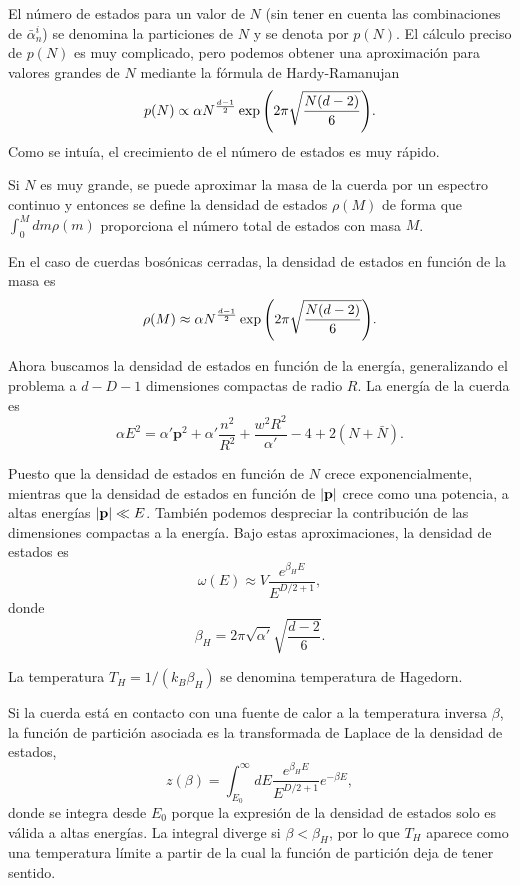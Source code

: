 El número de estados para un valor de $N$ (sin tener en cuenta las combinaciones de $\bar \alpha^i_n$) se denomina la particiones de $N$ 
y se denota por $p(N)$.
El cálculo preciso de $p(N)$ es muy complicado, pero podemos obtener una aproximación para
valores grandes de $N$ mediante la fórmula de Hardy-Ramanujan
\begin{equation}
  p(N)\propto \alpha N^ {\frac{d-1}{2}}\exp\qty(2\pi\sqrt{\frac{N(d-2)}{6}}).
\end{equation}
Como se intuía, el crecimiento de el número de estados es muy rápido.

Si $N$ es muy grande, se puede aproximar la masa de la cuerda por un espectro continuo y entonces se define la
densidad de estados $\rho(M)$ de forma que $\int_0^M dm \rho(m)$ proporciona el número total
de estados con masa $M$.

En el caso de cuerdas bosónicas cerradas, la densidad de estados en función de la masa es
\begin{equation}
  \rho(M)\approx \alpha N^ {\frac{d-1}{2}}\exp\qty(2\pi\sqrt{\frac{N(d-2)}{6}}).
\end{equation}

Ahora buscamos la densidad de estados en función de la energía, generalizando el problema a $d-D-1$ dimensiones compactas 
de radio $R$.
La energía de la cuerda es
\begin{equation}
  \alpha E^2 = \alpha' \mathbf p ^2 + \alpha'\frac{n^2}{R^2} + \frac{w^2 R^2}{\alpha'} -4+ 2(N+\bar N).
\end{equation}

Puesto que la densidad de estados en función de $N$ crece exponencialmente, mientras 
que la densidad de estados en función de $\abs{\mathbf p}$ crece como una potencia,
a altas energías $\abs{\mathbf p} \ll E$.
También podemos despreciar la contribución de las dimensiones compactas a la energía.
Bajo estas aproximaciones, la densidad de estados es
\begin{equation}
  \omega(E) \approx V \frac{e^{\beta_H E}}{E^{D/2+1}},
\end{equation}
donde 
\begin{equation}
  \beta_H = 2\pi \sqrt{\alpha'}\sqrt{\frac{d-2}{6}}.
\end{equation}

La temperatura $T_H=1/(k_B \beta_H)$ se denomina temperatura de Hagedorn.

Si la cuerda está en contacto con una fuente de calor a la temperatura inversa $\beta$, la función de partición asociada es la transformada de Laplace de la densidad de estados,
\begin{equation}
  z(\beta)=\int^\infty_{E_0} dE \frac{e^{\beta_H E}}{{E^{D/2+1}}}e^{-\beta E},
\end{equation}
donde se integra desde $E_0$ porque la expresión de la densidad de estados solo es válida a altas
energías.
La integral diverge si $\beta < \beta_H$, por lo que $T_H$ aparece como una temperatura límite
a partir de la cual la función de partición deja de tener sentido.

